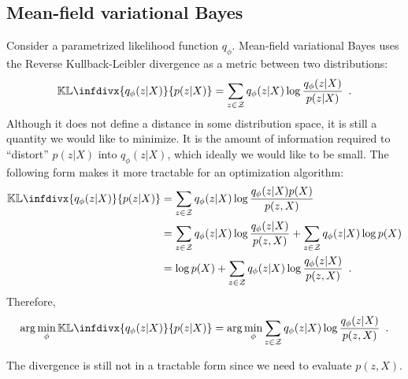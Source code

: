 \documentclass[12pt]{article}
\newcommand*\KL{\mathop{}\!\mathbb{KL}}
\newcommand{\infdiv}{\KL\infdivx}
\begin{document}
\subsection{Mean-field variational Bayes}

Consider a parametrized likelihood function $q_\phi$.
Mean-field variational Bayes uses the Reverse Kullback-Leibler divergence as a metric between two distributions:
%
\begin{equation}
    \label{eq:reverse_kl}
    \infdiv{q_\phi(z \vert X)}{p(z \vert X)} = 
    \sum_{z \in \mathcal{Z}}
    q_\phi(z \vert X)
    \log
    \frac{q_\phi(z \vert X)}{p(z \vert X)}
    \enspace .
\end{equation}
%
Although it does not define a distance in some distribution space, it is still a quantity we would like to minimize.
It is the amount of information required to ``distort'' $p(z \vert X)$ into $q_\phi(z \vert X)$, which ideally we would like to be small.
The following form makes it more tractable for an optimization algorithm:
%
\begin{align}
    \infdiv{q_\phi(z \vert X)}{p(z \vert X)} &= 
    \sum_{z \in \mathcal{Z}}
    q_\phi(z \vert X)
    \log
    \frac{q_\phi(z \vert X) p(X)}{p(z, X)} \\
    &= \sum_{z \in \mathcal{Z}}
    q_\phi(z \vert X)
    \log
    \frac{q_\phi(z \vert X)}{p(z, X)}
    +
    \sum_{z \in \mathcal{Z}}
    q_\phi(z \vert X)
    \log p(X) \\
    &= \log p(X)
    + \sum_{z \in \mathcal{Z}}
    q_\phi(z \vert X)
    \log
    \frac{q_\phi(z \vert X)}{p(z, X)}
    \enspace .
\end{align} 
%
Therefore,
%
\begin{equation}
    \arg \min_\phi \infdiv{q_\phi(z \vert X)}{p(z \vert X)} 
    = 
    \arg \min_\phi
    \sum_{z \in \mathcal{Z}}
    q_\phi(z \vert X)
    \log
    \frac{q_\phi(z \vert X)}{p(z, X)}
    \enspace . 
\end{equation}

The divergence is still not in a tractable form since we need to evaluate $p(z, X)$.
\end{document}

